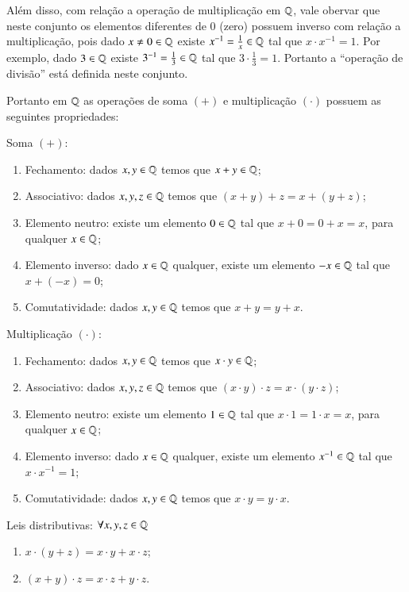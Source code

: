  Além disso, com relação a operação de multiplicação em $\mathbb{Q}$, vale obervar que neste conjunto os elementos diferentes de $0$ (zero) possuem inverso com relação a multiplicação, pois dado $x \neq 0 \in \mathbb{Q}$ existe $x^{-1}= \frac{1}{x} \in \mathbb{Q}$ tal que $x \cdot x^{-1}= 1$. Por exemplo, dado $3 \in \mathbb{Q}$ existe $3^{-1}= \frac{1}{3} \in \mathbb{Q}$ tal que $3 \cdot \frac{1}{3}= 1$. Portanto a ``operação de divisão'' está definida neste conjunto.
 
   \vskip0.3cm
 
 Portanto em $\mathbb{Q}$ as operações de soma $(+)$ e multiplicação $(\cdot)$ possuem as seguintes propriedades:
 
 Soma $(+)$:
 \begin{enumerate}[1)]
 \item Fechamento: dados $x, y \in \mathbb{Q}$ temos que $x+y \in \mathbb{Q}$;
 \item Associativo: dados $x, y, z \in \mathbb{Q}$ temos que $(x+y)+z= x+(y+z)$;
 \item Elemento neutro: existe um elemento $0 \in \mathbb{Q}$ tal que $x+0=0+x=x$, para qualquer $x \in \mathbb{Q}$;
 \item Elemento inverso: dado $x \in \mathbb{Q}$ qualquer, existe um elemento $-x \in \mathbb{Q}$ tal que $x+(-x)=0$;
 \item Comutatividade: dados $x, y \in \mathbb{Q}$ temos que $x+y= y+x$. 
 \end{enumerate}
 
  Multiplicação $(\cdot)$:
 \begin{enumerate}[1)]
 \item Fechamento: dados $x, y \in \mathbb{Q}$ temos que $x \cdot y \in \mathbb{Q}$;
 \item Associativo: dados $x, y, z \in \mathbb{Q}$ temos que $(x \cdot y) \cdot z= x \cdot (y \cdot z)$;
 \item Elemento neutro: existe um elemento $1 \in \mathbb{Q}$ tal que $x \cdot 1= 1 \cdot x= x$, para qualquer $x \in \mathbb{Q}$;
 \item Elemento inverso: dado $x \in \mathbb{Q}$ qualquer, existe um elemento $x^{-1} \in \mathbb{Q}$ tal que $x \cdot x^{-1}= 1$;
 \item Comutatividade: dados $x, y \in \mathbb{Q}$ temos que $x \cdot y= y \cdot x$. 
 \end{enumerate}
 
  Leis distributivas: $\forall x, y, z \in \mathbb{Q}$
 \begin{enumerate}[1)]
 \item $x \cdot (y + z)= x \cdot y + x \cdot z$;
 \item $(x + y) \cdot z= x \cdot z + y \cdot z$.
 \end{enumerate}
 
